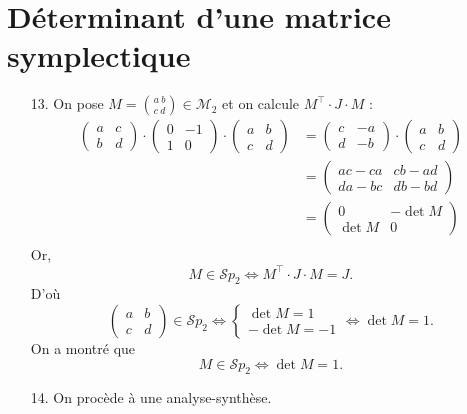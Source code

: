 \documentclass[a4paper]{article}
\begin{document}
	\section*{Déterminant d'une matrice symplectique}
	\begin{enumerate}
		\item[13.]
			On pose $M = {a\:b\choose c\:d} \in \mathscr{M}_2$\/ et on calcule $M^\top \cdot J\cdot M$\/ :
			\begin{align*}
				\begin{pmatrix}
					a&c\\
					b&d
				\end{pmatrix} \cdot \begin{pmatrix}
					0&-1\\
					1&0
				\end{pmatrix}  \cdot \begin{pmatrix}
					a&b\\
					c&d
				\end{pmatrix}
				&= \begin{pmatrix}
					c&-a\\
					d&-b
				\end{pmatrix} \cdot \begin{pmatrix}
					a&b\\
					c&d
				\end{pmatrix} \\
				&= \begin{pmatrix}
					ac-ca&cb-ad\\
					da-bc&db-bd
				\end{pmatrix} \\
				&= \begin{pmatrix}
					0&-\det M\\
					\det M&0
				\end{pmatrix} \\
			\end{align*}
			Or, \[
				M \in \mathcal{S}p_2 \iff M^\top \cdot J\cdot M = J
			.\]
			D'où \[
				\begin{pmatrix}
					a&b\\
					c&d
				\end{pmatrix} \in \mathcal{S}p_2 \iff \begin{cases}
					\det M = 1\\
					-\det M = -1
				\end{cases} \iff \det M = 1
			.\]
			On a montré que \[
				\boxed{M \in \mathcal{S}p_{2} \iff \det M = 1.}
			\]
		\item[14.]On procède à une analyse-synthèse.

\end{enumerate}
\end{document}
